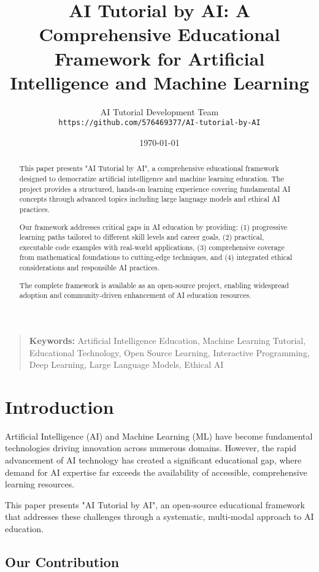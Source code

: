 \documentclass[11pt,twocolumn]{article}
\title{AI Tutorial by AI: A Comprehensive Educational Framework for Artificial Intelligence and Machine Learning}
\author{
    AI Tutorial Development Team\\
    \texttt{https://github.com/576469377/AI-tutorial-by-AI}
}
\date{\today}
\begin{document}
\maketitle

\begin{abstract}
This paper presents "AI Tutorial by AI", a comprehensive educational framework designed to democratize artificial intelligence and machine learning education. The project provides a structured, hands-on learning experience covering fundamental AI concepts through advanced topics including large language models and ethical AI practices. 

Our framework addresses critical gaps in AI education by providing: (1) progressive learning paths tailored to different skill levels and career goals, (2) practical, executable code examples with real-world applications, (3) comprehensive coverage from mathematical foundations to cutting-edge techniques, and (4) integrated ethical considerations and responsible AI practices.

The complete framework is available as an open-source project, enabling widespread adoption and community-driven enhancement of AI education resources.
\end{abstract}

\begin{quote}
\textbf{Keywords:} Artificial Intelligence Education, Machine Learning Tutorial, Educational Technology, Open Source Learning, Interactive Programming, Deep Learning, Large Language Models, Ethical AI
\end{quote}

\section{Introduction}

Artificial Intelligence (AI) and Machine Learning (ML) have become fundamental technologies driving innovation across numerous domains. However, the rapid advancement of AI technology has created a significant educational gap, where demand for AI expertise far exceeds the availability of accessible, comprehensive learning resources.

This paper presents "AI Tutorial by AI", an open-source educational framework that addresses these challenges through a systematic, multi-modal approach to AI education.

\subsection{Our Contribution}
\end{document}
